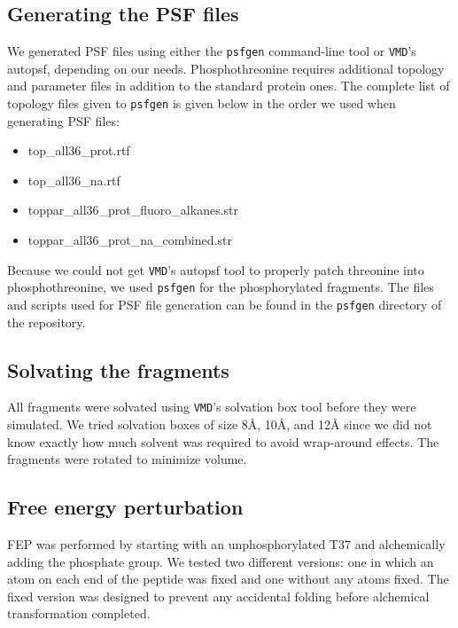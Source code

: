 
\subsection{Generating the PSF files}
We generated PSF files using either the \texttt{psfgen} command-line tool or \texttt{VMD}'s autopsf, depending on our needs.
Phosphothreonine requires additional topology and parameter files in addition to the standard protein ones.
The complete list of topology files given to \texttt{psfgen} is given below in the order we used when generating PSF files:
\begin{itemize} \itemsep 1pt
  \item top\_all36\_prot.rtf
  \item top\_all36\_na.rtf
  \item toppar\_all36\_prot\_fluoro\_alkanes.str
  \item toppar\_all36\_prot\_na\_combined.str
\end{itemize}
Because we could not get \texttt{VMD}'s autopsf tool to properly patch threonine into phosphothreonine, we used \texttt{psfgen} for the phosphorylated fragments.
The files and scripts used for PSF file generation can be found in the \texttt{psfgen} directory of the repository.

\subsection{Solvating the fragments}
All fragments were solvated using \texttt{VMD}'s solvation box tool before they were simulated.
We tried solvation boxes of size 8\AA, 10\AA, and 12{\AA} since we did not know exactly how much solvent was required to avoid wrap-around effects.
The fragments were rotated to minimize volume.

\subsection{Free energy perturbation}
FEP was performed by starting with an unphosphorylated T37 and alchemically adding the phosphate group.
We tested two different versions: one in which an atom on each end of the peptide was fixed and one without any atoms fixed.
The fixed version was designed to prevent any accidental folding before alchemical transformation completed.

